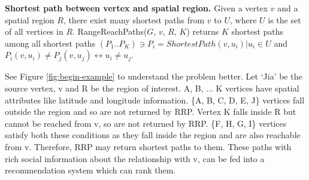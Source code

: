 \textbf{Shortest path between vertex and spatial region.} Given a vertex $v$ and a spatial region $R$, there exist many shortest paths from $v$ to $U$, where $U$ is the set of all vertices in $R$. RangeReachPaths($G$, $v$, $R$, $K$) returns $K$ shortest paths among all shortest paths $(P_1..P_K) \ni P_i = ShortestPath(v, u_i) | u_i \in U$ and $P_i(v, u_i) \neq P_j(v, u_j) \leftrightarrow u_i \neq u_j$.

\iffalse
Given a graph $G(V, E)$ where,

\quad$V \rightarrow set\ of\ vertices$

\quad$E \rightarrow set\ of\ edges$

$Vs \subset V$ have spatial attributes; i.e. $\forall v \in Vs \Leftrightarrow v.spatial$ attribute exists\\


\textbf{RangeReachPaths S(G, v, R, K):} an ordered list of K shortest paths starting from v that reach a region R in graph G, where R is a spatial range predicate. Let's abbreviate this as RRP(G, v, R, K).

\textbf{Path, P(u, w):} A set of vertices along the way from u to w \(\Rightarrow w\ is\ reachable\ from\ u\)

\quad${P(u, w) \in S(v, R) \Leftrightarrow}$

\quad\quad{u = v and}

\quad\quad${w \in Vs}$ and

\quad\quad{w.spatial lies in region R}\\

\fi

See Figure \ref{fig:begin-example} to understand the problem better. Let `Jia' be the source vertex, v and R be the region of interest. A, B, ... K vertices have spatial attributes like latitude and longitude information. \{A, B, C, D, E, J\} vertices fall outside the region and so are not returned by RRP. Vertex K falls inside R but cannot be reached from v, so are not returned by RRP. \{F, H, G, I\} vertices satisfy both these conditions as they fall inside the region and are also reachable from v. Therefore, RRP may return shortest paths to them. These paths with rich social information about the relationship with v, can be fed into a recommendation system which can rank them.
